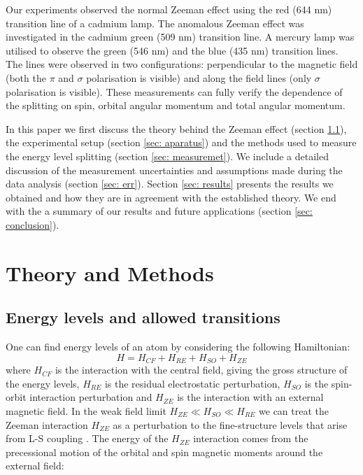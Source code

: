 \documentclass[11pt]{article}
\begin{document}
Our experiments observed the normal Zeeman effect using the red (644 nm) transition line of a cadmium lamp. The anomalous Zeeman effect was investigated in the cadmium green (509  nm) transition line. A mercury lamp was utilised to observe the green (546 nm) and the blue (435 nm) transition lines. The lines were observed in two configurations: perpendicular to the magnetic field (both the $\pi$ and $\sigma$ polarisation is visible) and along the field lines (only $\sigma$ polarisation is visible). These measurements can fully verify the dependence of the splitting on spin, orbital angular momentum and total angular momentum. 

In this paper we first discuss the theory behind the Zeeman effect (section \ref{sec: theory}), the experimental setup (section \ref{sec: aparatus}) and the methods used to measure the energy level splitting (section \ref{sec: measuremet}). We include a detailed discussion of the measurement uncertainties and assumptions made during the data analysis (section \ref{sec: err}). Section \ref{sec: results} presents the results we obtained and how they are in agreement with the established theory. We end with the a summary of our results and future applications (section \ref{sec: conclusion}). 


\section{Theory and Methods}
\subsection{Energy levels and allowed transitions} \label{sec: theory}
One can find energy levels of an atom by considering the following Hamiltonian: 
\begin{equation}
    H = H_{CF} + H_{RE} + H_{SO} + H_{ZE} \label{eq: atomic ham}
\end{equation}
where $H_{CF}$ is the interaction with the central field, giving the gross structure of the energy levels, $H_{RE}$ is the residual electrostatic perturbation, $H_{SO}$ is the spin-orbit interaction perturbation and $H_{ZE}$ is the interaction with an external magnetic field. In the weak field limit $H_{ZE} \ll H_{SO} \ll H_{RE}$ we can treat the Zeeman interaction $H_{ZE}$ as a perturbation to the fine-structure levels that arise from L-S coupling \cite{Binney_Skinner_2015}. The energy of the $H_{ZE}$ interaction comes from the precessional motion of the orbital and spin magnetic moments around the external field: 
\end{document}
